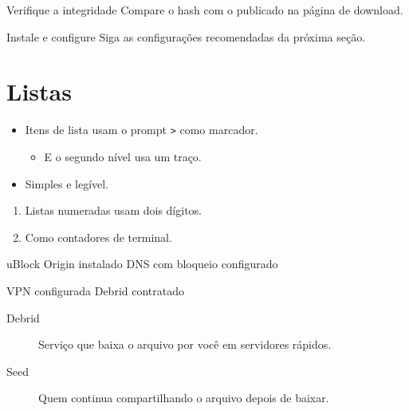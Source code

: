 \documentclass{pousadaguide}
\begin{document}
\begin{passo}{Verifique a integridade}
Compare o hash  com o publicado na página de download.
\end{passo}

\begin{passo}{Instale e configure}
Siga as configurações recomendadas da próxima seção.
\end{passo}

\section{Listas}

\begin{itemize}
  \item Itens de lista usam o prompt \texttt{>} como marcador.
  \begin{itemize}
    \item E o segundo nível usa um traço.
  \end{itemize}
  \item Simples e legível.
\end{itemize}

\begin{enumerate}
  \item Listas numeradas usam dois dígitos.
  \item Como contadores de terminal.
\end{enumerate}

\begin{checklist}
  \feito uBlock Origin instalado
  \feito DNS com bloqueio configurado
  \item VPN configurada
  \opcional Debrid contratado
\end{checklist}

\divisor

\begin{description}
  \item[Debrid] Serviço que baixa o arquivo por você em servidores rápidos.
  \item[Seed] Quem continua compartilhando o arquivo depois de baixar.
\end{description}

\contracapa
\end{document}
